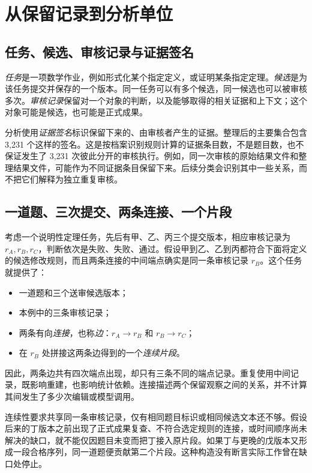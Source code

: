 \section{从保留记录到分析单位}
\label{sec:materials}
\subsection{任务、候选、审核记录与证据签名}
\label{subsec:record-units}
\emph{任务}是一项数学作业，例如形式化某个指定定义，或证明某条指定定理。\emph{候选}是为该任务提交并保存的一个版本。同一任务可以有多个候选，同一候选也可以被审核多次。\emph{审核记录}保留对一个对象的判断，以及能够取得的相关证据和上下文；这个对象可能是候选，也可能是正式成果。

分析使用\emph{证据签名}标识保留下来的、由审核者产生的证据。整理后的主要集合包含 3,231 个这样的签名。这是按档案识别规则计算的证据条目数，不是题目数，也不保证发生了 3,231 次彼此分开的审核执行。例如，同一次审核的原始结果文件和整理结果文件，可能作为不同证据条目保留下来。后续分类会识别其中一些关系，而不把它们解释为独立重复审核。

\subsection{一道题、三次提交、两条连接、一个片段}
\label{subsec:running-example}
考虑一个说明性定理任务，先后有甲、乙、丙三个提交版本，相应审核记录为 $r_A,r_B,r_C$，判断依次是失败、失败、通过。假设甲到乙、乙到丙都符合下面将定义的候选修改规则，而且两条连接的中间端点确实是同一条审核记录 $r_B$。这个任务就提供了：
\begin{itemize}[leftmargin=*,nosep]
\item 一道题和三个送审候选版本；
\item 本例中的三条审核记录；
\item 两条有向\emph{连接}，也称\emph{边}：$r_A\to r_B$ 和 $r_B\to r_C$；
\item 在 $r_B$ 处拼接这两条边得到的一个\emph{连续片段}。
\end{itemize}
因此，两条边共有四次端点出现，却只有三条不同的端点记录。重复使用中间记录，既影响重建，也影响统计依赖。连接描述两个保留观察之间的关系，并不计算其间发生了多少次编辑或模型调用。

连续性要求共享同一条审核记录，仅有相同题目标识或相同候选文本还不够。假设后来的丁版本之前出现了正式成果复查、不符合选定规则的连接，或时间顺序尚未解决的缺口，就不能仅因题目未变而把丁接入原片段。如果丁与更晚的戊版本又形成一段合格序列，同一道题便贡献第二个片段。这种构造没有断言实际工作曾在缺口处停止。

